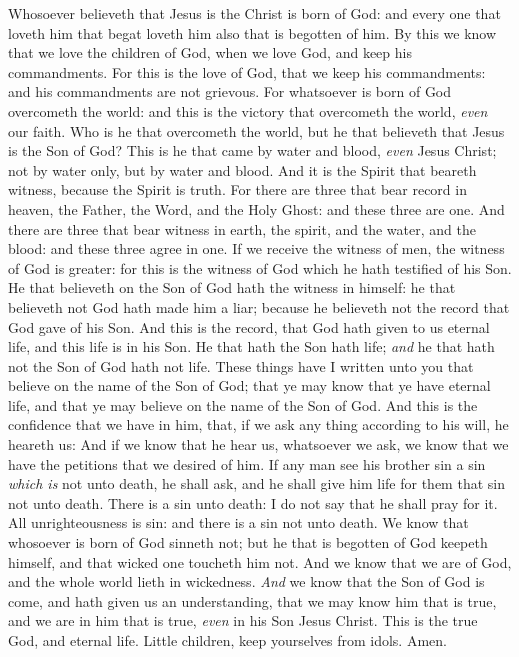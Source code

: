 \documentclass[11pt,letterpaper,oneside]{memoir}
\begin{document}
Whosoever believeth that Jesus is the Christ is born of God: and every
one that loveth him that begat loveth him also that is begotten of him.
By this we know that we love the children of God, when we love God, and
keep his commandments. For this is the love of God, that we keep his
commandments: and his commandments are not grievous. For whatsoever is
born of God overcometh the world: and this is the victory that
overcometh the world, \emph{even} our faith. Who is he that overcometh
the world, but he that believeth that Jesus is the Son of God? This is
he that came by water and blood, \emph{even} Jesus Christ; not by water
only, but by water and blood. And it is the Spirit that beareth witness,
because the Spirit is truth. For there are three that bear record in
heaven, the Father, the Word, and the Holy Ghost: and these three are
one. And there are three that bear witness in earth, the spirit, and the
water, and the blood: and these three agree in one. If we receive the
witness of men, the witness of God is greater: for this is the witness
of God which he hath testified of his Son. He that believeth on the Son
of God hath the witness in himself: he that believeth not God hath made
him a liar; because he believeth not the record that God gave of his
Son. And this is the record, that God hath given to us eternal life, and
this life is in his Son. He that hath the Son hath life; \emph{and} he
that hath not the Son of God hath not life. These things have I written
unto you that believe on the name of the Son of God; that ye may know
that ye have eternal life, and that ye may believe on the name of the
Son of God. And this is the confidence that we have in him, that, if we
ask any thing according to his will, he heareth us: And if we know that
he hear us, whatsoever we ask, we know that we have the petitions that
we desired of him. If any man see his brother sin a sin \emph{which is}
not unto death, he shall ask, and he shall give him life for them that
sin not unto death. There is a sin unto death: I do not say that he
shall pray for it. All unrighteousness is sin: and there is a sin not
unto death. We know that whosoever is born of God sinneth not; but he
that is begotten of God keepeth himself, and that wicked one toucheth
him not. And we know that we are of God, and the whole world lieth in
wickedness. \emph{And} we know that the Son of God is come, and hath
given us an understanding, that we may know him that is true, and we are
in him that is true, \emph{even} in his Son Jesus Christ. This is the
true God, and eternal life. Little children, keep yourselves from idols.
Amen.
\end{document}
